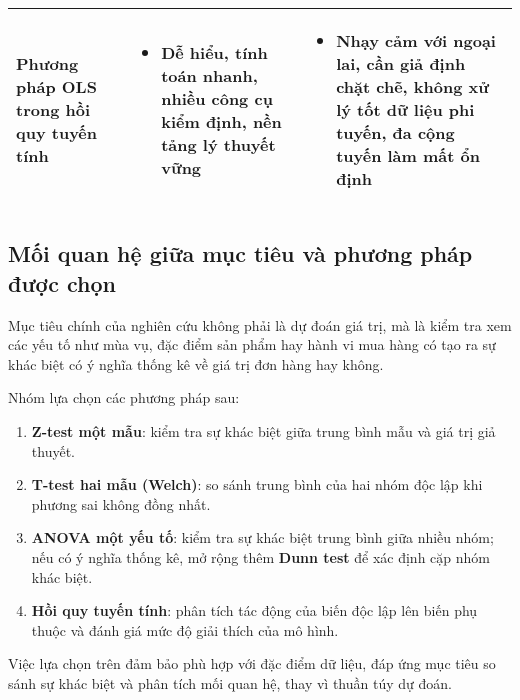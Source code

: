 \begin{table}[H]
\begin{tabular}{|p{3.2cm}|p{5.5cm}|p{5.5cm}|}
\textbf{Phương pháp OLS trong hồi quy tuyến tính} &
\begin{itemize}[leftmargin=*, topsep=0pt, partopsep=0pt, parsep=0pt, itemsep=0pt]
    \item Dễ hiểu, tính toán nhanh, nhiều công cụ kiểm định, nền tảng lý thuyết vững
\end{itemize} &
\begin{itemize}[leftmargin=*, topsep=0pt, partopsep =0pt, parsep=0pt, itemsep=0pt]
    \item Nhạy cảm với ngoại lai, cần giả định chặt chẽ, không xử lý tốt dữ liệu phi tuyến, đa cộng tuyến làm mất ổn định
\end{itemize} \\ \hline 

\end{tabular}
\end{table}

\subsection{Mối quan hệ giữa mục tiêu và phương pháp được chọn}

Mục tiêu chính của nghiên cứu không phải là dự đoán giá trị, mà là kiểm tra xem các yếu tố như mùa vụ, đặc điểm sản phẩm hay hành vi mua hàng có tạo ra sự khác biệt có ý nghĩa thống kê về giá trị đơn hàng hay không. 

Nhóm lựa chọn các phương pháp sau:
\begin{enumerate}
    \item \textbf{Z-test một mẫu}: kiểm tra sự khác biệt giữa trung bình mẫu và giá trị giả thuyết.
    \item \textbf{T-test hai mẫu (Welch)}: so sánh trung bình của hai nhóm độc lập khi phương sai không đồng nhất.
    \item \textbf{ANOVA một yếu tố}: kiểm tra sự khác biệt trung bình giữa nhiều nhóm; nếu có ý nghĩa thống kê, mở rộng thêm \textbf{Dunn test} để xác định cặp nhóm khác biệt.
    \item \textbf{Hồi quy tuyến tính}: phân tích tác động của biến độc lập lên biến phụ thuộc và đánh giá mức độ giải thích của mô hình.
\end{enumerate}

Việc lựa chọn trên đảm bảo phù hợp với đặc điểm dữ liệu, đáp ứng mục tiêu so sánh sự khác biệt và phân tích mối quan hệ, thay vì thuần túy dự đoán.
